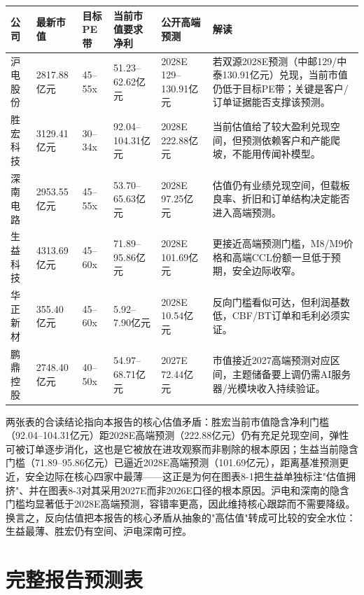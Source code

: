 \begin{exhibitbox}[图表8-6：反向估值隐含净利润门槛]
\footnotesize
\begin{tabularx}{\textwidth}{L{1.8cm}R{1.8cm}R{1.8cm}R{2.2cm}R{2.1cm}X}
\toprule
\textbf{公司} & \textbf{最新市值} & \textbf{目标PE带} & \textbf{当前市值要求净利} & \textbf{公开高端预测} & \textbf{解读} \\
\midrule
沪电股份 & 2817.88亿元 & 45--55x & 51.23--62.62亿元 & 2028E 129--130.91亿元 & 若双源2028E预测（中邮129/中泰130.91亿元）兑现，当前市值仍低于目标PE带；关键是客户/订单证据能否支撑该预测。 \\
胜宏科技 & 3129.41亿元 & 30--34x & 92.04--104.31亿元 & 2028E 222.88亿元 & 当前估值给了较大盈利兑现空间，但预测依赖客户和产能爬坡，不能用传闻补模型。 \\
深南电路 & 2953.55亿元 & 45--55x & 53.70--65.63亿元 & 2028E 97.25亿元 & 估值仍有业绩兑现空间，但载板良率、折旧和订单结构决定能否进入高端预测。 \\
生益科技 & 4313.69亿元 & 45--60x & 71.89--95.86亿元 & 2028E 101.69亿元 & 更接近高端预测门槛，M8/M9价格和高端CCL份额一旦低于预期，安全边际收窄。 \\
华正新材 & 355.40亿元 & 45--60x & 5.92--7.90亿元 & 2028E 10.54亿元 & 反向门槛看似可达，但利润基数低，CBF/BT订单和毛利必须实证。 \\
鹏鼎控股 & 2748.40亿元 & 40--50x & 54.97--68.71亿元 & 2027E 72.44亿元 & 市值接近2027高端预测对应区间，主题储备要上调仍需AI服务器/光模块收入持续验证。 \\
\bottomrule
\end{tabularx}
\end{exhibitbox}

两张表的合读结论指向本报告的核心估值矛盾：胜宏当前市值隐含净利门槛（92.04--104.31亿元）距2028E高端预测（222.88亿元）仍有充足兑现空间，弹性可被订单逐步消化，这也是它被放在进攻观察而非剔除的根本原因；生益当前隐含门槛（71.89--95.86亿元）已逼近2028E高端预测（101.69亿元），距离基准预测更近，安全边际在核心四家中最薄——这正是为何在图表8-1把生益单独标注"估值拥挤"、并在图表8-3对其采用2027E而非2026E口径的根本原因。沪电和深南的隐含门槛均显著低于2028E高端预测，容错率更高，因此维持核心跟踪而不需要降级。换言之，反向估值把本报告的核心矛盾从抽象的"高估值"转成可比较的安全水位：生益最薄、胜宏仍有空间、沪电深南可控。

\section{完整报告预测表}

